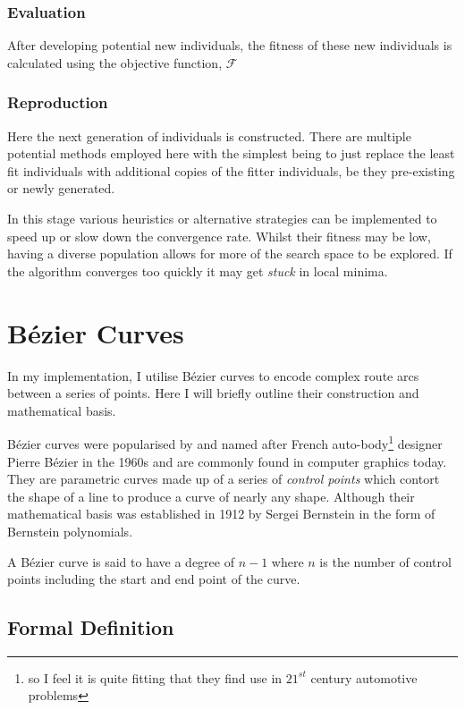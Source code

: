 \subsubsection{Evaluation}
After developing potential new individuals, the fitness of these new individuals is calculated using the objective function, $\mathcal{F}$

\subsubsection{Reproduction}
Here the next generation of individuals is constructed. There are multiple potential methods employed here with the simplest being to just replace the least fit individuals with additional copies of the fitter individuals, be they pre-existing or newly generated.

In this stage various heuristics or alternative strategies can be implemented to speed up or slow down the convergence rate. Whilst their fitness may be low, having a diverse population allows for more of the search space to be explored. If the algorithm converges too quickly it may get \textit{stuck} in local minima. 


\section{Bézier Curves}
\label{sec:back-bezier-curves}

In my implementation, I utilise Bézier curves to encode complex route arcs between a series of points. Here I will briefly outline their construction and mathematical basis.

Bézier curves were popularised by and named after French auto-body\footnote{so I feel it is quite fitting that they find use in $21^{st}$ century automotive problems} designer Pierre Bézier in the 1960s and are commonly found in computer graphics today. They are parametric curves made up of a series of \textit{control points} which contort the shape of a line to produce a curve of nearly any shape. Although their mathematical basis was established in 1912 by Sergei Bernstein in the form of Bernstein polynomials\cite{bernstein1912best}.

A Bézier curve is said to have a degree of $n-1$ where $n$ is the number of control points including the start and end point of the curve.

\subsection{Formal Definition}

